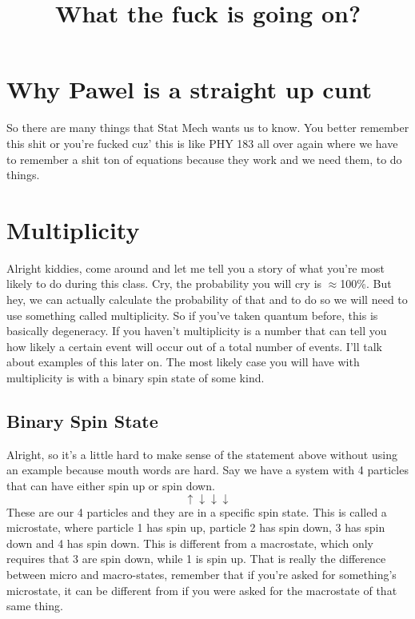 \documentclass[arial]{article}
\begin{document}
\title{What the fuck is going on?}
\maketitle


\section*{Why Pawel is a straight up cunt}
So there are many things that Stat Mech wants us to know. You better remember this shit or you're fucked cuz' this is like PHY 183 all over again where we have to remember a shit ton of equations because they work and we need them, to do things.

\section*{Multiplicity}
Alright kiddies, come around and let me tell you a story of what you're most likely to do during this class. Cry, the probability you will cry is $\approx$100\%. But hey, we can actually calculate the probability of that and to do so we will need to use something called multiplicity. So if you've taken quantum before, this is basically degeneracy. If you haven't multiplicity is a number that can tell you how likely a certain event will occur out of a total number of events. I'll talk about examples of this later on. The most likely case you will have with multiplicity is with a binary spin state of some kind.

\subsection*{Binary Spin State}
Alright, so it's a little hard to make sense of the statement above without using an example because mouth words are hard.
Say we have a system with 4 particles that can have either spin up or spin down. 
\begin{equation}
\uparrow \downarrow \downarrow \downarrow
\end{equation}
These are our 4 particles and they are in a specific spin state. This is called a microstate, where particle 1 has spin up, particle 2 has spin down, 3 has spin down and 4 has spin down. This is different from a macrostate, which only requires that 3 are spin down, while 1 is spin up. That is really the difference between micro and macro-states, remember that if you're asked for something's microstate, it can be different from if you were asked for the macrostate of that same thing.
\vspace{3mm}
\end{document}
